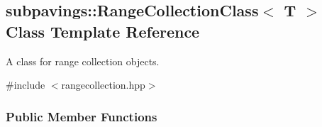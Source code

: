 \hypertarget{classsubpavings_1_1RangeCollectionClass}{\subsection{subpavings\-:\-:\-Range\-Collection\-Class$<$ \-T $>$ \-Class \-Template \-Reference}
\label{classsubpavings_1_1RangeCollectionClass}
}


\-A class for range collection objects.  




{\ttfamily \#include $<$rangecollection.\-hpp$>$}

\subsubsection*{\-Public \-Member \-Functions}
